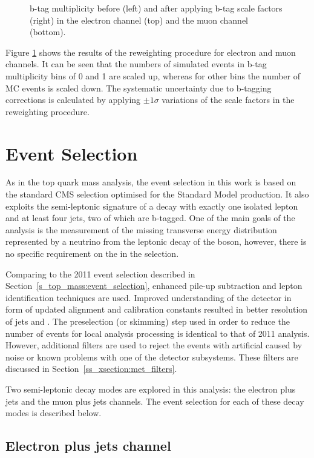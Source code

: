 \begin{figure}[!htpb]
\begin{center}
	\caption{\label{fig:bjet_weights}
    b-tag multiplicity before (left) and after applying b-tag scale factors (right) in the electron channel (top) and
    the muon channel (bottom).}
\end{center}
\end{figure}

Figure \ref{fig:bjet_weights} shows the results of the reweighting procedure for electron and muon channels. It can be
seen that the numbers of simulated events in b-tag multiplicity bins of \num{0} and \num{1} are scaled up, whereas for
other bins the number of MC events is scaled down. The systematic uncertainty due to b-tagging corrections is calculated
by applying $\pm 1 \sigma$ variations of the scale factors in the reweighting procedure.

\section{Event Selection}
\label{s_xsection:event_selection}
As in the top quark mass analysis, the event selection in this work is based on the standard CMS selection optimised for
the Standard Model \ttbar production. It also exploits the semi-leptonic signature of a \ttbar decay with exactly one
isolated lepton and at least four jets, two of which are b-tagged. One of the main goals of the analysis is the
measurement of the missing transverse energy distribution represented by a neutrino from the leptonic decay of the \W
boson, however, there is no specific requirement on the \MET in the selection.

Comparing to the 2011 event selection described in Section~\ref{s_top_mass:event_selection}, enhanced pile-up
subtraction and lepton identification techniques are used. Improved understanding of the detector in form of updated
alignment and calibration constants resulted in better resolution of jets and \MET. The preselection (or skimming) step
used in order to reduce the number of events for local analysis processing is identical to that of 2011 analysis.
However, additional filters are used to reject the events with artificial \MET caused by noise or known problems with
one of the detector subsystems. These filters are discussed in Section~\ref{ss_xsection:met_filters}.

Two semi-leptonic \ttbar decay modes are explored in this analysis: the electron plus jets and the muon plus jets
channels. The event selection for each of these decay modes is described below.

\subsection{Electron plus jets channel}
\label{ss_xsection:ejets}

